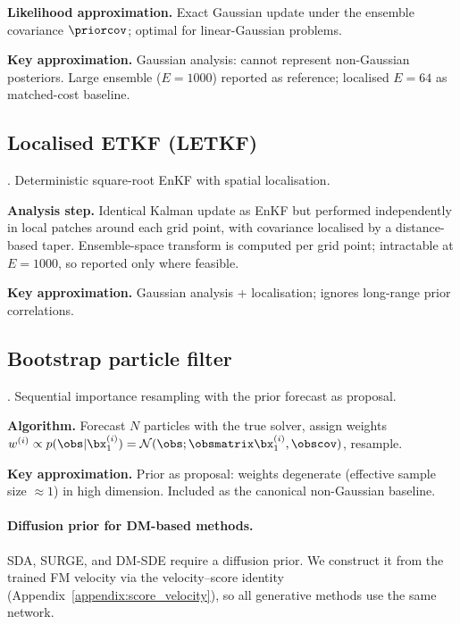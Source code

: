 \textbf{Likelihood approximation.}
Exact Gaussian update under the ensemble covariance $\priorcov$; optimal for linear-Gaussian problems.

\textbf{Key approximation.}
Gaussian analysis: cannot represent non-Gaussian posteriors.
Large ensemble ($E=1000$) reported as reference; localised $E=64$ as matched-cost baseline.

\subsection{Localised ETKF (LETKF)}\label{appendix:method:letkf}

\cite{hunt_efficient_2007}. Deterministic square-root EnKF with spatial localisation.

\textbf{Analysis step.}
Identical Kalman update as EnKF but performed independently in local patches around each grid point, with covariance localised by a distance-based taper.
Ensemble-space transform is computed per grid point; intractable at $E=1000$, so reported only where feasible.

\textbf{Key approximation.}
Gaussian analysis + localisation; ignores long-range prior correlations.

\subsection{Bootstrap particle filter}\label{appendix:method:pf}

\cite{carrassi_data_2018}. Sequential importance resampling with the prior forecast as proposal.

\textbf{Algorithm.}
Forecast $N$ particles with the true solver, assign weights $w^{(i)}\propto p(\obs|\bx_1^{(i)})
= \mathcal{N}(\obs;\obsmatrix\bx_1^{(i)},\obscov)$, resample.

\textbf{Key approximation.}
Prior as proposal: weights degenerate (effective sample size $\approx 1$) in high dimension.
Included as the canonical non-Gaussian baseline.

\paragraph{Diffusion prior for DM-based methods.}
SDA, SURGE, and DM-SDE require a diffusion prior.
We construct it from the trained FM velocity via the velocity--score identity (Appendix~\ref{appendix:score_velocity}),
so all generative methods use the same network.
